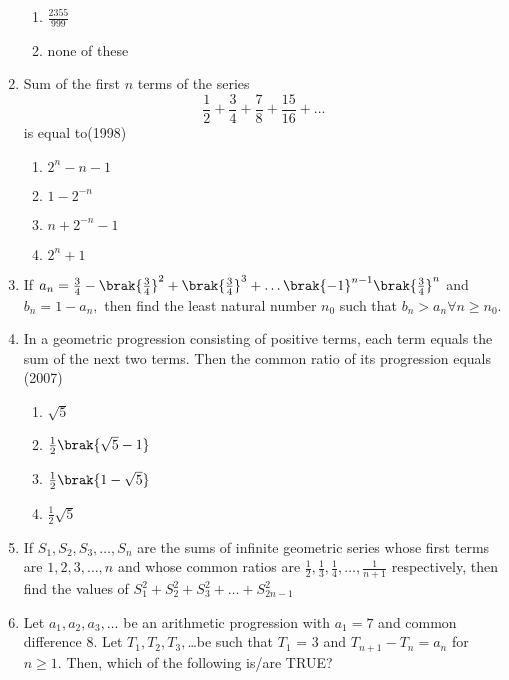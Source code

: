 \begin{enumerate}[label=\thesubsection.\arabic*,ref=\thesubsection.\theenumi]
\begin{multicols}{4}
\begin{enumerate}
        \item $\frac{2355}{999}$ 
        \item none of these 
    \end{enumerate}
\end{multicols}
    \item Sum of the first $ n$ terms of the series 
$$ \frac{1}{2}+ \frac{3}{4}+ \frac{7}{8}+ \frac{15}{16}+ \dots $$ is equal to\hfill (1998)
\begin{multicols}{4}
\begin{enumerate}    
    \item $2^n-n-1$  
    \item $1-2^{-n}$
    \item $n+2^{-n}-1$
    \item $2^n+1$
    \end{enumerate}
    \end{multicols}
%
	\item If $ a_n=\frac{3}{4}-\brak{\frac{3}{4}}^{2}+\brak{\frac{3}{4}}^{3}+\dots\brak{-1}^{n-1}\brak{\frac{3}{4}}^{n} $ and $ b_{n}=1-a_{n},  $ then find the least natural number $n_{0}$ such that $ b_{n} > a_{n} \forall n \geq n_{0}. $ 
%		             
		\hfill {}
    \item  In a geometric progression consisting of positive terms,  each term equals the sum of the next two terms. Then the common ratio of its progression equals   
    \hfill(2007)
%    
    \begin{multicols}{4}
\begin{enumerate}    
    \item$\sqrt{5}$
    \item$\frac{1}{2}\brak{\sqrt{5}-1}$
    \item$\frac{1}{2}\brak{1-\sqrt{5}}$
    \item$\frac{1}{2}\sqrt{5}$ 
    \end{enumerate}
\end{multicols}
      \item  If $ S_1, S_2, S_3, \dots, S_n $ are the sums of infinite geometric series whose first terms are $1, 2, 3, \dots, n$ and whose common ratios are $ \frac{1}{2}, \frac{1}{3}, \frac{1}{4}, \dots, \frac{1}{n+1} $ respectively,  then find the values of $ S_{1}^{2}+S_{2}^{2}+S_{3}^{2}+\dots+S_{2n-1}^{2} $
%      
	      \hfill {}
\item     Let $a_1, a_2, a_3,\dots$ be an arithmetic progression with $a_1 = 7$ and common difference 8. Let 
$T_1, T_2, T_3,$\dots be such that $T_1$ = 3 and $T_{n+1} - T_n = a_n$ for $n\ge1$. Then, which of the following is/are TRUE?

\end{enumerate}

